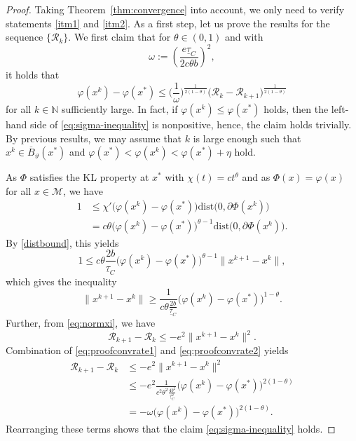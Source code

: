 \documentclass[a4paper, 12pt]{article}
\numberwithin{equation}{section}
\theoremstyle{bolddef}
\theoremstyle{definition}
\theoremstyle{boldplain}
\newcommand{\xk}{x^k}
\newcommand{\xkp}{x^{k+1}}
\newcommand{\taug}{\underline{\tau}}
\newcommand{\Rvalue}{\mathcal{R}}
\newcommand{\dist}{\mathrm{dist}}
\newcommand{\clball}{\overline{B}}
\begin{document}
\begin{proof}
Taking Theorem~\ref{thm:convergence} into account, we only need to verify statements \ref{itm1} and \ref{itm2}. As a first step, let us prove the results for the sequence $\{\Rvalue_k\}$. We first claim that for $\theta \in (0,1)$ and with
\begin{equation*}
	\omega := \left(\frac{e \taug_C}{2 c \theta b}\right)^2,
\end{equation*}
it holds that
\begin{equation}\label{eq:sigma-inequality}
	\varphi(\xk) - \varphi(x^*) \leq \Big(\frac{1}{\omega}\Big)^{\frac{1}{2(1-\theta)}} \big( \Rvalue_k - \Rvalue_{k+1} \big)^{\frac{1}{2(1-\theta)}}
\end{equation}
for all $k \in \mathbb{N}$ sufficiently large. In fact, if $\varphi(\xk) \leq \varphi(x^*)$ holds, then the left-hand side of \eqref{eq:sigma-inequality}
is nonpositive, hence, the claim holds trivially.
By previous results, we may assume that $k$ is large enough such 
that $\xk \in \clball_\vartheta (x^*)$ and $\varphi(x^*) < \varphi(\xk) < \varphi(x^*) + \eta$ hold.

As $\Phi$ satisfies the KL property at $x^*$ with $\chi(t) = ct^{\theta}$ and as $\Phi(x) = \varphi(x)$ for all $x \in \mathcal{M}$, we have
\begin{align*}
	1 & \leq \chi' \big( \varphi(\xk) - \varphi(x^*) \big)
	\dist \big( 0, \partial \Phi(\xk) \big)\\
	& = c\theta \big( \varphi(\xk) - \varphi(x^*) \big)^{\theta -1}
    \dist \big( 0, \partial \Phi (\xk) \big).
\end{align*}
By \eqref{distbound}, this yields
\begin{equation*}
	1 \leq c\theta \frac{2 b}{\taug_C}  \big( \varphi(\xk) - \varphi(x^*) \big)^{\theta -1} \| \xkp - x^k \|,
\end{equation*}
which gives the inequality
\begin{equation}\label{eq:proofconvrate1}
	\|\xkp - x^k \| \geq \frac{1}{c \theta \frac{2 b}{\taug_C}}
	\big( \varphi(\xk) - \varphi(x^*) \big)^{1-\theta}.
\end{equation}
Further, from \eqref{eq:normxi}, we have
\begin{equation}\label{eq:proofconvrate2}
	\Rvalue_{k+1} - \Rvalue_k \leq - e^2 \|\xkp - \xk \|^2 .
\end{equation}
Combination of \eqref{eq:proofconvrate1} and 
\eqref{eq:proofconvrate2} yields
\begin{align*}
	\Rvalue_{k+1} - \Rvalue_k &\leq - e^2 \|\xkp - x^k \|^2\\
	 & \leq - e^2 \frac{1}{c^2 \theta^2 \frac{4 b^2}{\taug_C^2}} 
	\big( \varphi(\xk) - \varphi(x^*) \big)^{2(1-\theta)}\\
	& = -\omega \big( \varphi(\xk) - \varphi(x^*) \big)^{2(1-\theta)} .
\end{align*}
Rearranging these terms shows that the claim \eqref{eq:sigma-inequality}
holds.


\end{proof}
\end{document}
